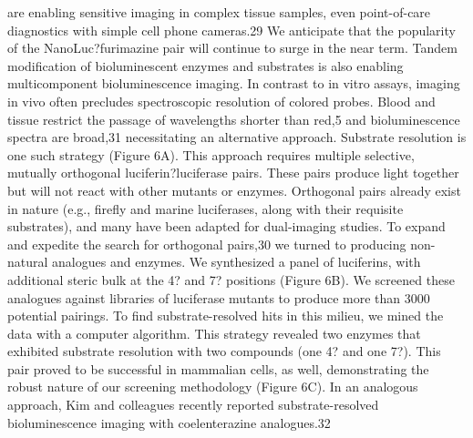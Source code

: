 are enabling sensitive imaging in complex tissue samples, even
point-of-care diagnostics with simple cell phone cameras.29 We
anticipate that the popularity of the NanoLuc?furimazine pair
will continue to surge in the near term.
Tandem modification of bioluminescent enzymes and
substrates is also enabling multicomponent bioluminescence
imaging. In contrast to in vitro assays, imaging in vivo often
precludes spectroscopic resolution of colored probes. Blood
and tissue restrict the passage of wavelengths shorter than red,5
and bioluminescence spectra are broad,31 necessitating an
alternative approach. Substrate resolution is one such strategy
(Figure 6A). This approach requires multiple selective,
mutually orthogonal luciferin?luciferase pairs. These pairs
produce light together but will not react with other mutants or
enzymes. Orthogonal pairs already exist in nature (e.g., firefly
and marine luciferases, along with their requisite substrates),
and many have been adapted for dual-imaging studies.
To expand and expedite the search for orthogonal pairs,30 we
turned to producing non-natural analogues and enzymes. We
synthesized a panel of luciferins, with additional steric bulk at
the 4? and 7? positions (Figure 6B). We screened these
analogues against libraries of luciferase mutants to produce
more than 3000 potential pairings. To find substrate-resolved
hits in this milieu, we mined the data with a computer
algorithm. This strategy revealed two enzymes that exhibited
substrate resolution with two compounds (one 4? and one 7?).
This pair proved to be successful in mammalian cells, as well,
demonstrating the robust nature of our screening methodology
(Figure 6C). In an analogous approach, Kim and colleagues
recently reported substrate-resolved bioluminescence imaging
with coelenterazine analogues.32
